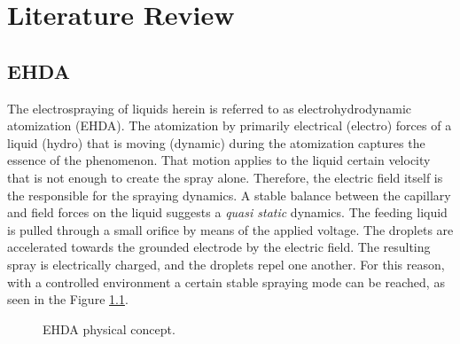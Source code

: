 \chapter{Literature Review}
\label{chap:lit_review}


\section{EHDA}
\label{sec:ehda_resume}

The electrospraying of liquids herein is referred to as electrohydrodynamic atomization (EHDA). The atomization by primarily electrical (electro) forces of a liquid (hydro) that is moving (dynamic) during the atomization captures the essence of the phenomenon.\cite{Grace}
That motion applies to the liquid certain velocity that is not enough to create the spray alone. Therefore, the electric field itself is the responsible for the spraying dynamics.\cite{prunet}
A stable balance between the capillary and field forces on the liquid suggests a \emph{quasi static} dynamics.
The feeding liquid is pulled through a small orifice by means of the applied voltage.
The droplets are accelerated towards the grounded electrode by the electric field.
The resulting spray is electrically charged, and the droplets repel one another.
For this reason, with a controlled environment a certain stable spraying mode can be reached, as seen in the Figure \ref{fig:ehda_setup_ex2}.

\begin{figure}[H]
  \centering
  \caption{EHDA physical concept\cite{Gabriel}.}
  \label{fig:ehda_setup_ex2}
\end{figure}



